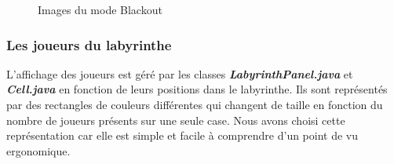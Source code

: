 \begin{figure}[!htb]
    \qquad

    \caption{Images du mode Blackout}%
\end{figure}

\subsubsection*{Les joueurs du labyrinthe}

L'affichage des joueurs est géré par les classes \textbf{\textit{LabyrinthPanel.java}} et \textbf{\textit{Cell.java}} en fonction de leurs positions dans le labyrinthe. Ils sont représentés par des rectangles de couleurs différentes qui changent de taille en fonction du nombre de joueurs présents sur une seule case. Nous avons choisi cette représentation car elle est simple et facile à comprendre d'un point de vu ergonomique.

